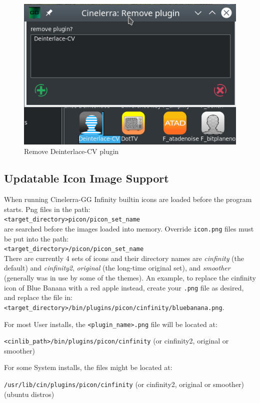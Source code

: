 \begin{figure}[htpb]
    \centering
    \includegraphics[width=0.7\linewidth]{images/remove-effect.png}
    \caption{Remove Deinterlace-CV plugin}
    \label{fig:remove-effect}
\end{figure}

\subsection{Updatable Icon Image Support}%
\label{sub:updatable_icon_image_support}

When running Cinelerra-GG Infinity builtin icons are loaded before the program starts. Png files in the path: \\ \texttt{<target\_directory>picon/picon\_set\_name} \\
are searched before the images loaded into memory. Override \texttt{icon.png} files must be put into the path: \\ \texttt{<target\_directory>/picon/picon\_set\_name} \\
There are currently 4 sets of icons and their directory names are \textit{cinfinity} (the default) and \textit{cinfinity2}, \textit{original} (the long-time original set), and \textit{smoother} (generally was in use by some of the themes). An example, to replace the cinfinity icon of Blue Banana with a red apple instead, create your \texttt{.png} file as desired, and replace the file in: \\ \texttt{<target\_directory>/bin/plugins/picon/cinfinity/bluebanana.png}.

For most User installs, the \texttt{<plugin\_name>.png} file will be located at:

\texttt{<cinlib\_path>/bin/plugins/picon/cinfinity} (or cinfinity2, original or smoother)

For some System installs, the files might be located at:

\texttt{/usr/lib/cin/plugins/picon/cinfinity} (or cinfinity2, original or smoother) (ubuntu distros)

